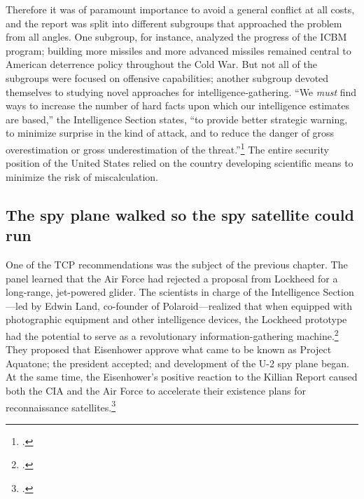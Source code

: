 \documentclass[11pt]{memoir}
\begin{document}
Therefore it was of paramount importance to avoid a general conflict at all costs, and the report was split into different subgroups that approached the problem from all angles. One subgroup, for instance, analyzed the progress of the ICBM program; building more missiles and more advanced missiles remained central to American deterrence policy throughout the Cold War. But not all of the subgroups were focused on offensive capabilities; another subgroup devoted themselves to studying novel approaches for intelligence-gathering. ``We \emph{must} find ways to increase the number of hard facts upon which our intelligence estimates are based,'' the Intelligence Section states, ``to provide better strategic warning, to minimize surprise in the kind of attack, and to reduce the danger of gross overestimation or gross underestimation of the threat.''\footcite{technological_capabilities_panel_meeting_1955} The entire security position of the United States relied on the country developing scientific means to minimize the risk of miscalculation.

\subsection{The spy plane walked so the spy satellite could run}
One of the TCP recommendations was the subject of the previous chapter. The panel learned that the Air Force had rejected a proposal from Lockheed for a long-range, jet-powered glider. The scientists in charge of the Intelligence Section---led by Edwin Land, co-founder of Polaroid---realized that when equipped with photographic equipment and other intelligence devices, the Lockheed prototype had the potential to serve as a revolutionary information-gathering machine.\footcite[p.~81-82]{killian_sputnik_1977} They proposed that Eisenhower approve what came to be known as Project Aquatone; the president accepted; and development of the U-2 spy plane began. At the same time, the Eisenhower's positive reaction to the Killian Report caused both the CIA and the Air Force to accelerate their existence plans for reconnaissance satellites.\footcite[p.~83]{killian_sputnik_1977}
\end{document}
